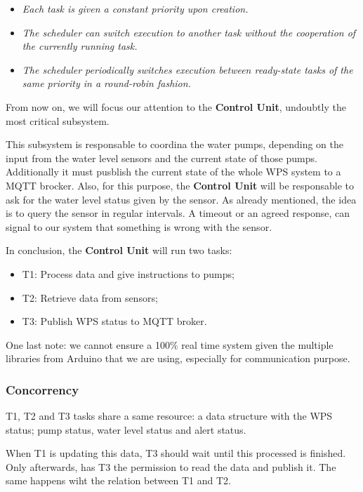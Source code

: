 \documentclass[11pt]{article}
\begin{document}
\begin{itemize}
	\item   \textit{Each task is given a constant priority upon creation.}
	\item  \textit{The scheduler can switch execution to another task without the cooperation of the currently running task.}
	\item  \textit{The scheduler periodically switches execution between ready-state tasks of the same priority in a round-robin fashion.} \cite{c1}
\end{itemize}

From now on, we will focus our attention to the \textbf{Control Unit}, undoubtly the most critical subsystem.

This subsystem is responsable to coordina the water pumps, depending on the input from the water level sensors and the current state of those pumps.
Additionally it must pusblish the current state of the whole WPS system to a MQTT brocker.
Also, for this purpose, the \textbf{Control Unit} will be responsable to ask for the water level status given by the sensor. As already mentioned, the idea is to query the sensor in regular intervals. A timeout or an agreed response, can signal to our system that something is wrong with the sensor.

In conclusion, the \textbf{Control Unit} will run two tasks:

\begin{itemize}
	\item  T1: Process data and give instructions to pumps;
	\item  T2: Retrieve data from sensors;
	\item  T3: Publish WPS status to MQTT broker.
\end{itemize}

One last note: we cannot ensure a 100\% real time system given the multiple libraries from Arduino that we are using, especially for communication purpose.

\subsubsection{Concorrency}

T1, T2 and T3 tasks share a same resource: a data structure with the WPS status; pump status, water level status and alert status.

When T1 is updating this data, T3 should wait until this processed is finished. Only afterwards, has T3 the permission to read the data and publish it.
The same happens wiht the relation between T1 and T2.
\end{document}
